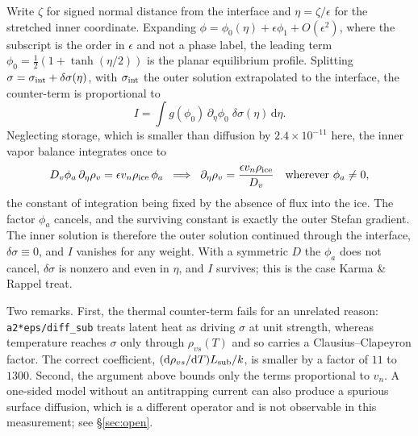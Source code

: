 \documentclass[11pt,a4paper]{article}
\newcommand{\code}[1]{\texttt{\small #1}}
\newcommand{\vn}{v_n}
\begin{document}
Write $\zeta$ for signed normal distance from the interface and $\eta=\zeta/\epsilon$ for
the stretched inner coordinate. Expanding $\phi=\phi_0(\eta)+\epsilon\phi_1+O(\epsilon^2)$,
where the subscript is the order in $\epsilon$ and not a phase label, the leading term
$\phi_0=\tfrac12(1+\tanh(\eta/2))$ is the planar equilibrium profile. Splitting
$\sigma=\sigma_{\rm int}+\delta\sigma(\eta)$, with $\sigma_{\rm int}$ the outer solution
extrapolated to the interface, the counter-term is proportional to
\begin{equation}
I=\int g(\phi_0)\,\partial_\eta\phi_0\;\delta\sigma(\eta)\,\mathrm{d}\eta .
\label{eq:I}
\end{equation}
Neglecting storage, which is smaller than diffusion by $2.4\times10^{-11}$ here, the inner
vapor balance integrates once to
\begin{equation}
D_v\phi_a\,\partial_\eta\rho_v=\epsilon \vn\rho_{\rm ice}\,\phi_a
\;\;\Longrightarrow\;\;
\partial_\eta\rho_v=\frac{\epsilon \vn\rho_{\rm ice}}{D_v}
\quad\text{wherever }\phi_a\neq0 ,
\end{equation}
the constant of integration being fixed by the absence of flux into the ice. The factor
$\phi_a$ cancels, and the surviving constant is exactly the outer Stefan gradient. The
inner solution is therefore the outer solution continued through the interface,
$\delta\sigma\equiv0$, and $I$ vanishes for any weight. With a symmetric $D$ the $\phi_a$
does not cancel, $\delta\sigma$ is nonzero and even in $\eta$, and $I$ survives; this is
the case Karma \& Rappel treat.

Two remarks. First, the thermal counter-term fails for an unrelated reason:
\code{a2*eps/diff\_sub} treats latent heat as driving $\sigma$ at unit strength, whereas
temperature reaches $\sigma$ only through $\rho_{vs}(T)$ and so carries a
Clausius--Clapeyron factor. The correct coefficient,
$(\mathrm{d}\rho_{vs}/\mathrm{d}T)L_{\rm sub}/k$, is smaller by a factor of $11$ to
$1300$. Second, the argument above bounds only the terms proportional to $\vn$. A
one-sided model without an antitrapping current can also produce a spurious surface
diffusion, which is a different operator and is not observable in this measurement; see
\S\ref{sec:open}.
\end{document}
